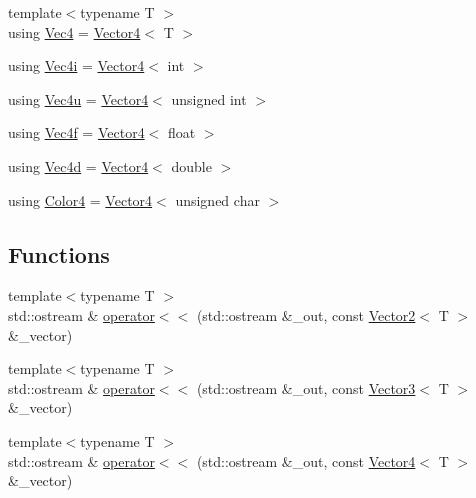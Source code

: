 \begin{DoxyCompactItemize}
\item 
{\footnotesize template$<$typename T $>$ }\\using \mbox{\hyperlink{namespacepad_1_1math_a97a1193114b33cea7a82ae656d507825}{Vec4}} = \mbox{\hyperlink{structpad_1_1math_1_1_vector4}{Vector4}}$<$ T $>$
\item 
using \mbox{\hyperlink{namespacepad_1_1math_a6b61fad19375a5164da9e1a86403f208}{Vec4i}} = \mbox{\hyperlink{structpad_1_1math_1_1_vector4}{Vector4}}$<$ int $>$
\item 
using \mbox{\hyperlink{namespacepad_1_1math_ad5b8d7d51edf8173f6a0ddbbb792c803}{Vec4u}} = \mbox{\hyperlink{structpad_1_1math_1_1_vector4}{Vector4}}$<$ unsigned int $>$
\item 
using \mbox{\hyperlink{namespacepad_1_1math_a4eb77014ac7b74bd24cf73bca82ac3a3}{Vec4f}} = \mbox{\hyperlink{structpad_1_1math_1_1_vector4}{Vector4}}$<$ float $>$
\item 
using \mbox{\hyperlink{namespacepad_1_1math_a845efb6de5d2237d1a7f27cf87741454}{Vec4d}} = \mbox{\hyperlink{structpad_1_1math_1_1_vector4}{Vector4}}$<$ double $>$
\item 
using \mbox{\hyperlink{namespacepad_1_1math_af6a050aafcf279514a0beada2fb7a173}{Color4}} = \mbox{\hyperlink{structpad_1_1math_1_1_vector4}{Vector4}}$<$ unsigned char $>$
\end{DoxyCompactItemize}
\subsection*{Functions}
\begin{DoxyCompactItemize}
\item 
{\footnotesize template$<$typename T $>$ }\\std\+::ostream \& \mbox{\hyperlink{namespacepad_1_1math_aef2c4cef650688967cb74c75c5d4aafa}{operator$<$$<$}} (std\+::ostream \&\+\_\+out, const \mbox{\hyperlink{structpad_1_1math_1_1_vector2}{Vector2}}$<$ T $>$ \&\+\_\+vector)
\item 
{\footnotesize template$<$typename T $>$ }\\std\+::ostream \& \mbox{\hyperlink{namespacepad_1_1math_a9e468612d54c187ec0eaac48e304e673}{operator$<$$<$}} (std\+::ostream \&\+\_\+out, const \mbox{\hyperlink{structpad_1_1math_1_1_vector3}{Vector3}}$<$ T $>$ \&\+\_\+vector)
\item 
{\footnotesize template$<$typename T $>$ }\\std\+::ostream \& \mbox{\hyperlink{namespacepad_1_1math_aea739f95f7147095cec34ccedee7eea2}{operator$<$$<$}} (std\+::ostream \&\+\_\+out, const \mbox{\hyperlink{structpad_1_1math_1_1_vector4}{Vector4}}$<$ T $>$ \&\+\_\+vector)
\end{DoxyCompactItemize}


